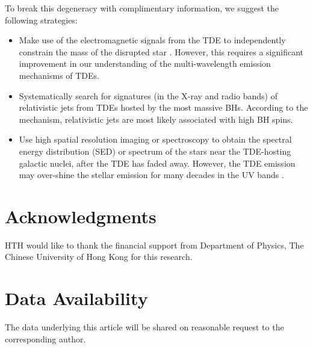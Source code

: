 \documentclass[useAMS,usenatbib]{mn2e}
\def\note{\textcolor{magenta}}
\begin{document}
To break this degeneracy with complimentary information, we suggest the following strategies:
\begin{itemize}
    \item Make use of the electromagnetic signals from the TDE to independently constrain the mass of the disrupted star \citep[e.g.,][]{Mockler22_stellar_mass_constraints}. However, this requires a significant improvement in our understanding of the multi-wavelength emission mechanisms of TDEs.
    \item Systematically search for signatures (in the X-ray and radio bands) of relativistic jets from TDEs hosted by the most massive BHs. According to the \citet{Blandford77_BHjet} mechanism, relativistic jets are most likely associated with high BH spins.
    \item Use high spatial resolution imaging or spectroscopy to obtain the spectral energy distribution (SED) or spectrum of the stars near the TDE-hosting galactic nuclei, after the TDE has faded away. However, the TDE emission may over-shine the stellar emission for many decades in the UV bands \citep{vanVelzen19_late_time_HST_UV}.
\end{itemize}



\section*{Acknowledgments}
HTH would like to thank the financial support from Department of Physics, The Chinese University of Hong Kong for this research. 

\section*{Data Availability}
The data underlying this article will be shared on reasonable request to the corresponding author.

{\small


}

\appendix
\end{document}
